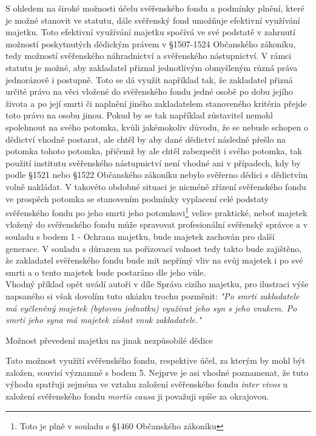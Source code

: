 \documentclass{article}
\begin{document}
 S ohledem na široké možnosti účelu svěřenského fondu a podmínky plnění, které je možné stanovit ve statutu, dále svěřenský fond umožňuje efektivní využívání majetku. Toto efektivní využívání majetku spočívá ve své podstatě v zahrnutí možností poskytnutých dědickým právem v §1507-1524 Občanského zákoníku, tedy možností svěřenského náhradnictví a svěřenského nástupnictví. V rámci statutu je možné, aby zakladatel přiznal jednotlivým obmyšleným různá práva jednorázově i postupně. Toto se dá využít například tak, že zakladatel přizná určité právo na věci vložené do svěřenského fondu jedné osobě po dobu jejího života a po její smrti či naplnění jiného zakladatelem stanoveného kritéria přejde toto právo na osobu jinou. Pokud by se tak například zůstavitel nemohl spolehnout na svého potomka, kvůli jakémokoliv důvodu, že se nebude schopen o dědictví vhodně postarat, ale chtěl by aby dané dědictví následně přešlo na potomka tohoto potomka, přičemž by ale chtěl zabezpečit i svého potomka, tak použití institutu svěřenského nástupnictví není vhodné ani v případech, kdy by podle §1521 nebo §1522 Občanského zákoníku nebylo svěřerno dědici s dědictvím volně nakládat. V takovéto obdobné situaci je nicméně zřízení svěřenského fondu ve prospěch potomka se stanovením podmínky vyplacení celé podstaty svěřenského fondu po jeho smrti jeho potomkovi\footnote{Toto je plně v souladu s §1460 Občanského zákoníku} velice praktické, neboť majetek vložený do svěřenského fondu může spravovat profesionální svěřenský správce a v souladu s bodem 1 - Ochrana majetku, bude majetek zachován pro další generace. V souladu s důrazem na pořizovací volnost tedy takto bude zajištěno, že zakladatel svěřenského fondu bude mít nepřímý vliv na svůj majetek i po své smrti a o tento majetek bude postaráno dle jeho vůle.\\
 
 Vhodný příklad opět uvádí autoři v díle Správa cizího majetku, pro ilustraci výše napsaného si však dovolím tuto ukázku trochu pozměnit: \textit{"Po smrti zakladatele má vyčleněný majetek (bytovou jednotku) využívat jeho syn s jeho vnukem. Po smrti jeho syna má majetek získat vnuk zakladatele."}
 
   \begin{enumerate}
 {\Large\item[6.] Možnost převedení majetku na jinak nezpůsobilé dědice}
 \end{enumerate}
 
Tato možnost využítí svěřenského fondu, respektive účel, za kterým by mohl být založen, souvisí významně s bodem 5. Nejprve je asi vhodné poznamenat, že tuto výhodu spatřuji zejména ve vztahu založení svěřenského fondu \textit{inter vivos} u založení svěřenského fondu \textit{mortis causa} ji považuji spíše za okrajovou.\\
\end{document}
